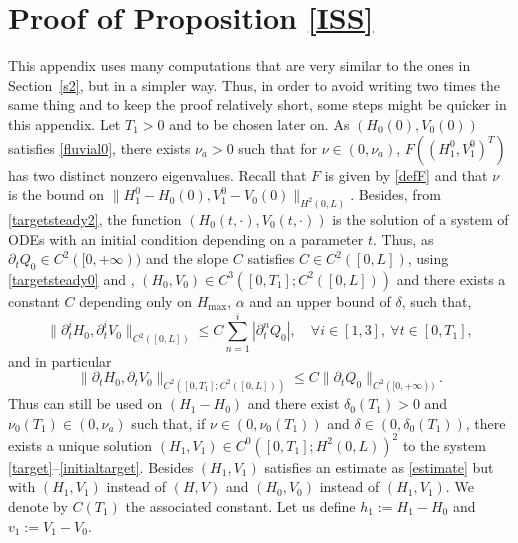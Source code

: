 \section{Proof of Proposition \ref{ISS}}
\label{AppendixISS}
This appendix uses many computations that are very similar to the {ones}
in Section~\ref{s2}, but in a simpler way. Thus, in order to avoid writing two times the same thing and to keep the proof relatively short, some steps might be quicker in this appendix.
Let $T_{1}\!>\!0$ and to be chosen later on. As $(H_{0}(0),V_{0}(0))$ satisfies \eqref{fluvial0}, there exists \hbox{$\nu_{a}\!>\!0$} such that for $\nu\in(0,\nu_{a})$, $F((H_{1}^{0},V_{1}^{0})^{T})$
has two distinct nonzero eigenvalues. Recall that $F$ is given by \eqref{defF} and that $\nu$ is the bound on \hbox{$\lVert H_{1}^{0}-H_{0}(0),V_{1}^{0}-V_{0}(0)\rVert_{H^{2}(0,L)}$}.
Besides, from \eqref{targetsteady2}, the function $(H_{0}(t,\cdot),V_{0}(t,\cdot))$ is the solution of a system of {ODEs} with an initial condition depending on a parameter $t$. Thus, as $\partial_{t}Q_{0}\in C^{2}([0,+\infty))$ and the slope $C$ satisfies $C\in C^{2}([0,L])$,
using \eqref{targetsteady0} and \cite[Chap.\,5, Th.\,3.1]{Hartman}, $(H_{0},V_{0})\in C^{3}([0,T_{1}]; C^{2}([0,L]))$ and there exists a constant $C$ depending only on $H_{\max}$, $\alpha$ {and
an upper bound of $\delta$,} such that,
{\begin{equation}
\label{boundH0V0}
\lVert\partial_{t}^{i}H_{0},\partial_{t}^{i}V_{0}\rVert_{C^{2}([0,L])}\leq C\sum\limits_{n=1}^{i}\left|\partial_{t}^{n}Q_{0}\right|,\quad\forall i\in[1,3],\ \forall t\in[0,T_{1}],
\end{equation} and in particular}
\begin{equation}
\lVert\partial_{t} H_{0},\partial_{t} V_{0}\rVert_{C^{2}([0,T_{1}];C^{2}([0,L]))}\leq C \lVert\partial_{t}Q_{0}\rVert_{C^{{2}}([0,+\infty))}.
\label{H0V0bound}
\end{equation}
Thus \cite[Th.\,2.1]{Wang} can still be used
{on $(H_{1}-H_{0})$}
and
there exist $\delta_{0}(T_{1})>0$ and $\nu_{0}(T_{1})\in(0,\nu_{a})$ such that, if $\nu\in(0,\nu_{0}(T_{1}))$ and $\delta\in(0,\delta_{0}(T_{1}))$, there exists a unique solution $(H_{1},V_{1})\in C^{0}([0,T_{1}];H^{2}(0,L))^{{2}}$ to the system \eqref{target}--\eqref{initialtarget}.
Besides $(H_{1},V_{1})$ satisfies an estimate as \eqref{estimate} but with $(H_{1},V_{1})$ instead of $(H,V)$ and $(H_{0},V_{0})$ instead of $(H_{1},V_{1})$. We denote by $C(T_{1})$ the associated constant.
Let us define $h_{1}:=H_{1}-H_{0}$ and $v_{1}:=V_{1}-V_{0}$.
